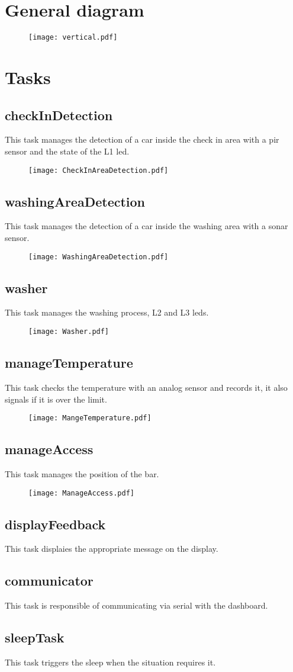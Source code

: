 \pagebreak
\section{General diagram}
\begin{figure}[H]
    \centering
    \texttt{[image: vertical.pdf]}
\end{figure}
\pagebreak
\section{Tasks}
\subsection{checkInDetection}
This task manages the detection of a car inside the check in area with a pir sensor and the state of the L1 led.
\begin{figure}[H]
    \centering
    \texttt{[image: CheckInAreaDetection.pdf]}
\end{figure}
\subsection{washingAreaDetection}
This task manages the detection of a car inside the washing area with a sonar sensor.
\begin{figure}[H]
    \centering
\texttt{[image: WashingAreaDetection.pdf]}
\end{figure}
\subsection{washer}
This task manages the washing process, L2 and L3 leds.
\begin{figure}[H]
    \centering
\texttt{[image: Washer.pdf]}
\end{figure}
\subsection{manageTemperature}
This task checks the temperature with an analog sensor and records it, it also signals if it is over the limit.
\begin{figure}[H]
    \centering
\texttt{[image: MangeTemperature.pdf]}
\end{figure}
\subsection{manageAccess}
This task manages the position of the bar.
\begin{figure}[H]
    \centering
\texttt{[image: ManageAccess.pdf]}
\end{figure}
\subsection{displayFeedback}
This task displaies the appropriate message on the display.
\subsection{communicator}
This task is responsible of communicating via serial with the dashboard.
\subsection{sleepTask}
This task triggers the sleep when the situation requires it.

